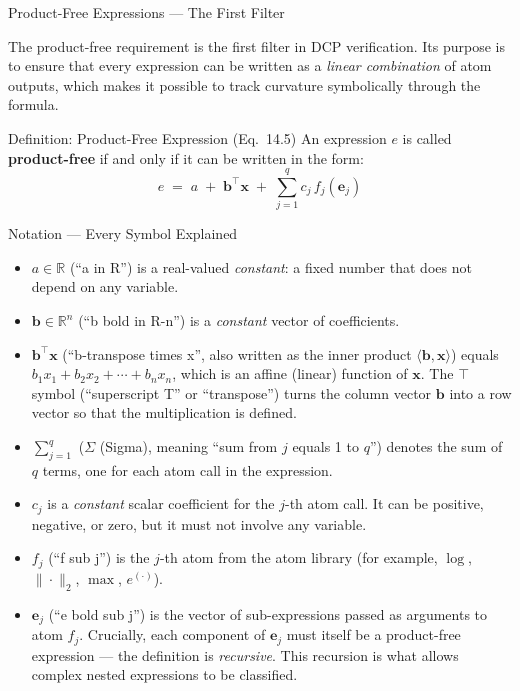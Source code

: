 \documentclass[aspectratio=169,10pt]{beamer}
\begin{document}
\begin{frame}[allowframebreaks]{Product-Free Expressions --- The First Filter}

  The product-free requirement is the first filter in DCP verification.
  Its purpose is to ensure that every expression can be written as a
  \emph{linear combination} of atom outputs, which makes it possible to
  track curvature symbolically through the formula.

  \begin{block}{Definition: Product-Free Expression (Eq.\ 14.5)}
    An expression $e$ is called \textbf{product-free} if and only if it
    can be written in the form:
    \[
      e \;=\; a \;+\; \mathbf{b}^{\top}\mathbf{x}
              \;+\; \sum_{j=1}^{q} c_j \, f_j(\mathbf{e}_j)
    \]
  \end{block}

  \begin{block}{Notation --- Every Symbol Explained}
    \begin{itemize}
      \item $a \in \mathbb{R}$ (``a in R'') is a real-valued
            \emph{constant}: a fixed number that does not depend on
            any variable.
      \item $\mathbf{b} \in \mathbb{R}^n$ (``b bold in R-n'') is a
            \emph{constant} vector of coefficients.
      \item $\mathbf{b}^{\top}\mathbf{x}$ (``b-transpose times x'',
            also written as the inner product $\langle \mathbf{b},
            \mathbf{x}\rangle$) equals $b_1 x_1 + b_2 x_2 + \cdots +
            b_n x_n$, which is an affine (linear) function of
            $\mathbf{x}$.  The $\top$ symbol (``superscript T'' or
            ``transpose'') turns the column vector $\mathbf{b}$ into a
            row vector so that the multiplication is defined.
      \item $\sum_{j=1}^{q}$ ($\Sigma$ (Sigma), meaning ``sum from
            $j$ equals 1 to $q$'') denotes the sum of $q$ terms, one
            for each atom call in the expression.
      \item $c_j$ is a \emph{constant} scalar coefficient for the
            $j$-th atom call.  It can be positive, negative, or zero,
            but it must not involve any variable.
      \item $f_j$ (``f sub j'') is the $j$-th atom from the atom
            library (for example, $\log$, $\|\cdot\|_2$, $\max$,
            $e^{(\cdot)}$).
      \item $\mathbf{e}_j$ (``e bold sub j'') is the vector of
            sub-expressions passed as arguments to atom $f_j$.
            Crucially, each component of $\mathbf{e}_j$ must itself be
            a product-free expression --- the definition is
            \emph{recursive}.  This recursion is what allows complex
            nested expressions to be classified.
    \end{itemize}
  \end{block}


\end{frame}
\end{document}
